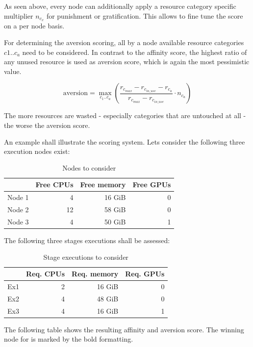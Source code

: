 As seen above, every node can additionally apply a resource category specific multiplier $n_{c_x}$ for punishment or gratification.
This allows to fine tune the score on a per node basis.

For determining the aversion scoring, all by a node available resource categories $c1 .. c_a$ need to be considered.
In contrast to the affinity score, the highest ratio of any unused resource is used as aversion score, which is again the most pessimistic value.

\begin{equation}
	\label{election:eq:aversion}
	\text{aversion} = \max_{c_1 .. c_a} \left( \frac{r_{c_{max}} - r_{c_{in\_use}} - r_{c_a}}{r_{c_{max}}  - r_{c_{in\_use}}} \cdot n_{c_a} \right)
\end{equation}

The more resources are wasted - especially categories that are untouched at all - the worse the aversion score.

An example shall illustrate the scoring system.
Lets consider the following three execution nodes exist:

\begin{table}[H]
	\centering
	\begin{tabular}{l|r|r|r}
		 & Free CPUs & Free memory & Free GPUs \\
		 \hline
		 Node 1 & 4  	& 16 GiB & 0 \\
		 Node 2 & 12 	& 58 GiB & 0 \\
		 Node 3 & 4 	& 50 GiB & 1 \\
	\end{tabular}
	\caption{Nodes to consider}
\end{table}

The following three stages executions shall be assessed:

\begin{table}[H]
	\centering
	\begin{tabular}{l|r|r|r}
		& Req. CPUs & Req. memory & Req. GPUs \\
		\hline
		Ex1 & 2 & 16 GiB & 0 \\
		Ex2 & 4 & 48 GiB & 0 \\
		Ex3 & 4 & 16 GiB & 1 \\
	\end{tabular}
	\caption{Stage executions to consider}
\end{table}

The following table shows the resulting affinity and aversion score.
The winning node for is marked by the bold formatting.


